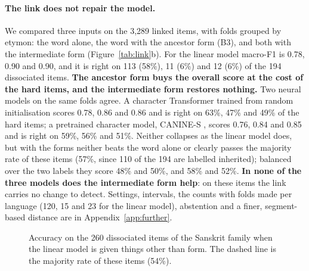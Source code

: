 \documentclass[11pt]{article}
\begin{document}
\paragraph{The link does not repair the model.} We compared three inputs on the 3,289 linked items, with folds grouped by etymon: the word alone, the word with the ancestor form (B3), and both with the intermediate form (Figure~\ref{tab:link}b). For the linear model macro-F1 is 0.78, 0.90 and 0.90, and it is right on 113 (58\%), 11 (6\%) and 12 (6\%) of the 194 dissociated items. \textbf{The ancestor form buys the overall score at the cost of the hard items, and the intermediate form restores nothing.} Two neural models on the same folds agree. A character Transformer trained from random initialisation scores 0.78, 0.86 and 0.86 and is right on 63\%, 47\% and 49\% of the hard items; a pretrained character model, CANINE-S \citep{clark2022canine}, scores 0.76, 0.84 and 0.85 and is right on 59\%, 56\% and 51\%. Neither collapses as the linear model does, but with the forms neither beats the word alone or clearly passes the majority rate of these items (57\%, since 110 of the 194 are labelled inherited); balanced over the two labels they score 48\% and 50\%, and 58\% and 52\%. \textbf{In none of the three models does the intermediate form help}: on these items the link carries no change to detect. Settings, intervals, the counts with folds made per language (120, 15 and 23 for the linear model), abstention and a finer, segment-based distance are in Appendix~\ref{app:further}.

\begin{figure}[t]
\centering
{}
\caption{Accuracy on the 260 dissociated items of the Sanskrit family when the linear model is given things other than form. The dashed line is the majority rate of these items (54\%).}
\label{fig:helps}
\end{figure}
\end{document}
